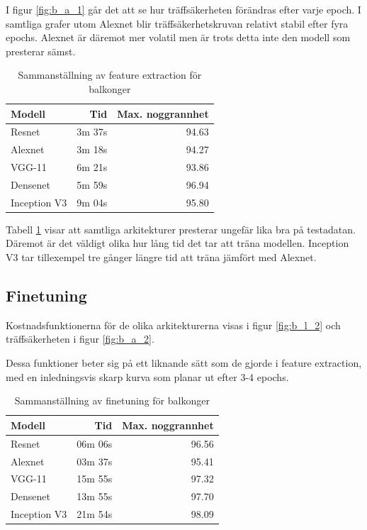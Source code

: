 \documentclass[]{kththesis}
\begin{document}
I figur \ref{fig:b_a_1} går det att se hur träffsäkerheten förändras efter varje epoch.
I samtliga grafer utom Alexnet blir träffsäkerhetskruvan relativt stabil efter fyra epochs.
Alexnet är däremot mer volatil men är trots detta inte den modell som presterar sämst.



\begin{table}[h]
  \centering
  \begin{tabular}{|l|r|r|}
    Modell & Tid & Max. noggrannhet \\ 
    \hline
    Resnet       & 3m 37s & 94.63 \\
    Alexnet      & 3m 18s & 94.27 \\
    VGG-11       & 6m 21s & 93.86 \\
    Densenet     & 5m 59s & 96.94 \\
    Inception V3 & 9m 04s & 95.80 \\
  \end{tabular}
  \caption{Sammanställning av feature extraction för balkonger}
  \label{fig:sam_1}
  
\end{table}

Tabell \ref{fig:sam_1} visar att samtliga arkitekturer presterar ungefär lika bra på testadatan.
Däremot är det väldigt olika hur lång tid det tar att träna modellen. 
Inception V3 tar tillexempel tre gånger längre tid att träna jämfört med Alexnet.

\subsection{Finetuning}
Kostnadsfunktionerna för de olika arkitekturerna visas i figur \ref{fig:b_l_2} och träffsäkerheten i figur \ref{fig:b_a_2}. 

Dessa funktioner beter sig på ett liknande sätt som de gjorde i feature extraction, med en inledningsvis skarp kurva som planar ut efter 3-4 epochs.



\begin{table}[!htbp]
  \centering
  \begin{tabular}{|l|r|r|}
    Modell & Tid & Max. noggrannhet \\ 
    \hline
    Resnet       & 06m 06s & 96.56 \\
    Alexnet      & 03m 37s & 95.41 \\
    VGG-11       & 15m 55s & 97.32 \\
    Densenet     & 13m 55s & 97.70 \\
    Inception V3 & 21m 54s & 98.09 \\
  \end{tabular}
  
  \caption{Sammanställning av finetuning för balkonger}
  \label{fig:sam_2}
  
\end{table}
\end{document}

